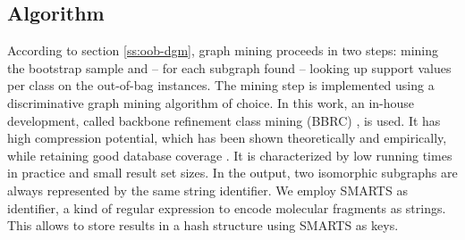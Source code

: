 \documentclass{article}
\begin{document}
\subsection{Algorithm}
\label{s:Algorithm}
According to section \ref{ss:oob-dgm}, graph mining proceeds in two steps:
mining the bootstrap sample and -- for each subgraph found -- looking up
support values per class on the out-of-bag instances.  The mining step is
implemented using a discriminative graph mining algorithm of choice. In this
work, an in-house development, called backbone refinement class mining (BBRC)
\cite{maunz09largescale}, is used.  It has high compression potential, which
has been shown theoretically and empirically, while retaining good database
coverage \cite{maunz11efficient}.  It is characterized by low running times in
practice and small result set sizes. In the output, two isomorphic subgraphs
are always represented by the same string identifier.  We employ SMARTS as
identifier, a kind of regular expression to encode molecular fragments as
strings.  This allows to store results in a hash structure using SMARTS as
keys.
\end{document}

